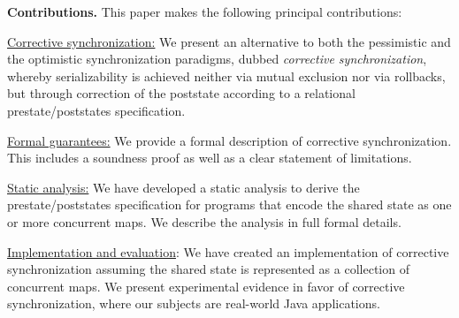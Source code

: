 
\noindent \textbf{Contributions.} This paper makes the following principal contributions:
\begin{compactenum}
	\item \underline{Corrective synchronization:} We present an alternative to both the pessimistic and the optimistic synchronization paradigms, dubbed \emph{corrective synchronization}, whereby serializability is achieved neither via mutual exclusion nor via rollbacks, but through correction of the poststate according to a relational prestate/poststates specification.
	\item \underline{Formal guarantees:} We provide a formal description of corrective synchronization. This includes a soundness proof as well as a clear statement of limitations.
	\item \underline{Static analysis:} We have developed a static analysis to derive the prestate/poststates specification for programs that encode the shared state as one or more concurrent maps. We describe the analysis in full formal details.
	\item \underline{Implementation and evaluation}: We have created an implementation of corrective synchronization assuming the shared state is represented as a collection of concurrent maps. We present experimental evidence in favor of corrective synchronization, where our subjects are real-world Java applications.
\end{compactenum}